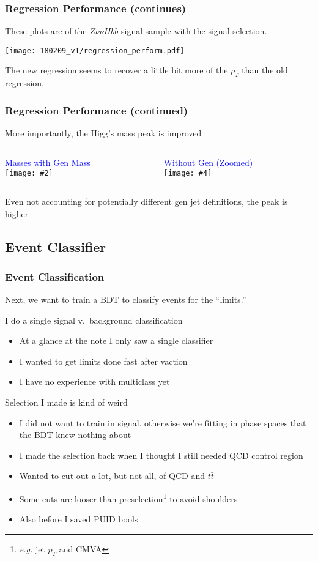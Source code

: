 \documentclass{beamer}
\newcommand{\twofigs}[4]{
  \begin{columns}
    \begin{column}{0.5\linewidth}
      \centering
      \textcolor{blue}{#1} \\
      \texttt{[image: \#2]}
    \end{column}
    \begin{column}{0.5\linewidth}
      \centering
      \textcolor{blue}{#3} \\
      \texttt{[image: \#4]}
    \end{column}
  \end{columns}
}
\newcommand{\ttbar}{\ensuremath{t\bar{t}}}
\begin{document}
\begin{frame}
  \frametitle{Regression Performance (continues)}

  These plots are of the $Z\nu\nu Hbb$ signal sample with the signal selection.

  \begin{center}
    \texttt{[image: 180209\_v1/regression\_perform.pdf]}
  \end{center}

  The new regression seems to recover a little bit more of the $p_T$ than the old regression.

\end{frame}

\begin{frame}
  \frametitle{Regression Performance (continued)}

  More importantly, the Higg's mass peak is improved

  \twofigs{Masses with Gen Mass}
          {180209_v1/regression_withgen.pdf}
          {Without Gen (Zoomed)}
          {180209_v1/regression.pdf}

  Even not accounting for potentially different gen jet definitions, the peak is higher

\end{frame}

\subsection{Event Classifier}

\begin{frame}
  \frametitle{Event Classification}

  Next, we want to train a BDT to classify events for the ``limits.''

  I do a single signal v.~background classification
  \begin{itemize}
  \item At a glance at the note I only saw a single classifier
  \item I wanted to get limits done fast after vaction
  \item I have no experience with multiclass yet
  \end{itemize}

  Selection I made is kind of weird

  \begin{itemize}
  \item I did not want to train in signal.
    otherwise we're fitting in phase spaces that the BDT knew nothing about
  \item I made the selection back when I thought I still needed QCD control region
  \item Wanted to cut out a lot, but not all, of QCD and \ttbar
  \item Some cuts are looser than preselection\footnote{\emph{e.g.} jet $p_T$ and CMVA}
    to avoid shoulders
  \item Also before I saved PUID bools
  \end{itemize}

\end{frame}
\end{document}
